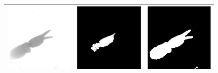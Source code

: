 \begin{figure}
\begin{tabular}{|c|c|c|}
\includegraphics[scale=0.4]{correcSrc2.png} & \includegraphics[scale=0.4]{correcOut1-2.jpg} & \includegraphics[scale=0.4]{correcOut2-2.jpg} \\
\hline

\end{tabular}
\end{figure}
